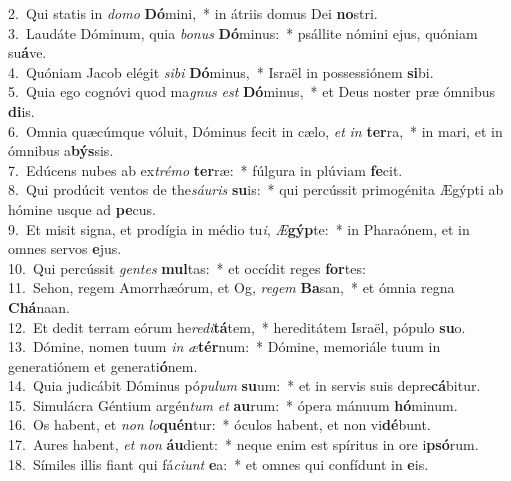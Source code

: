 {2.~}Qui statis in \textit{do}\textit{mo} \textbf{Dó}mini,~* in átriis domus Dei \textbf{no}stri.\\
{3.~}Laudáte Dóminum, quia \textit{bo}\textit{nus} \textbf{Dó}minus:~* psállite nómini ejus, quóniam su\textbf{á}ve.\\
{4.~}Quóniam Jacob elégit \textit{si}\textit{bi} \textbf{Dó}minus,~* Israël in possessiónem \textbf{si}bi.\\
{5.~}Quia ego cognóvi quod ma\textit{gnus} \textit{est} \textbf{Dó}minus,~* et Deus noster præ ómnibus \textbf{di}is.\\
{6.~}Omnia quæcúmque vóluit, Dóminus fecit in cælo, \textit{et} \textit{in} \textbf{ter}ra,~* in mari, et in ómnibus a\textbf{býs}sis.\\
{7.~}Edúcens nubes ab ex\textit{tré}\textit{mo} \textbf{ter}ræ:~* fúlgura in plúviam \textbf{fe}cit.\\
{8.~}Qui prodúcit ventos de the\textit{sáu}\textit{ris} \textbf{su}is:~* qui percússit primogénita Ægýpti ab hómine usque ad \textbf{pe}cus.\\
{9.~}Et misit signa, et prodígia in médio tu\textit{i}, \textit{Æ}\textbf{gýp}te:~* in Pharaónem, et in omnes servos \textbf{e}jus.\\
{10.~}Qui percússit \textit{gen}\textit{tes} \textbf{mul}tas:~* et occídit reges \textbf{for}tes:\\
{11.~}Sehon, regem Amorrhæórum, et Og, \textit{re}\textit{gem} \textbf{Ba}san,~* et ómnia regna \textbf{Chá}naan.\\
{12.~}Et dedit terram eórum he\textit{re}\textit{di}\textbf{tá}tem,~* hereditátem Israël, pópulo \textbf{su}o.\\
{13.~}Dómine, nomen tuum \textit{in} \textit{æ}\textbf{tér}num:~* Dómine, memoriále tuum in generatiónem et generati\textbf{ó}nem.\\
{14.~}Quia judicábit Dóminus pó\textit{pu}\textit{lum} \textbf{su}um:~* et in servis suis depre\textbf{cá}bitur.\\
{15.~}Simulácra Géntium argén\textit{tum} \textit{et} \textbf{au}rum:~* ópera mánuum \textbf{hó}minum.\\
{16.~}Os habent, et \textit{non} \textit{lo}\textbf{quén}tur:~* óculos habent, et non vi\textbf{dé}bunt.\\
{17.~}Aures habent, \textit{et} \textit{non} \textbf{áu}dient:~* neque enim est spíritus in ore i\textbf{psó}rum.\\
{18.~}Símiles illis fiant qui fá\textit{ci}\textit{unt} \textbf{e}a:~* et omnes qui confídunt in \textbf{e}is.\\
